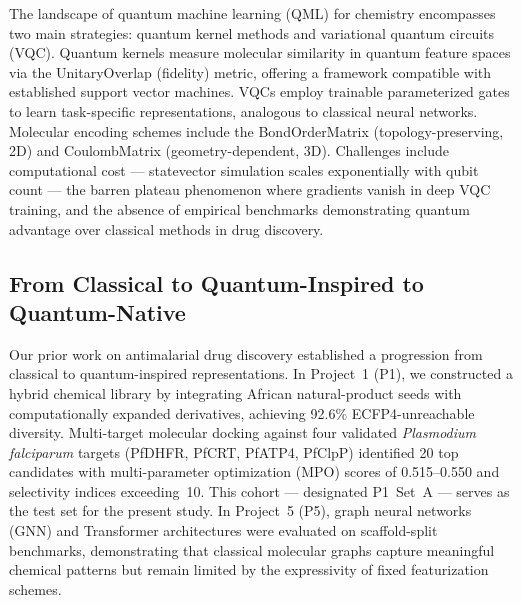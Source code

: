 The landscape of quantum machine learning (QML) for chemistry encompasses two main strategies: quantum kernel methods\cite{Havlicek2019QuantumKernel,Schuld2019QuantumML} and variational quantum circuits (VQC).\cite{Cerezo2021VQA,McClean2018Barren} Quantum kernels measure molecular similarity in quantum feature spaces via the UnitaryOverlap (fidelity) metric,\cite{Havlicek2019QuantumKernel} offering a framework compatible with established support vector machines. VQCs employ trainable parameterized gates to learn task-specific representations,\cite{Benedetti2019PQC} analogous to classical neural networks. Molecular encoding schemes include the BondOrderMatrix\cite{Boy2025QMSE} (topology-preserving, 2D) and CoulombMatrix\cite{Rupp2012CoulombMatrix} (geometry-dependent, 3D). Challenges include computational cost — statevector simulation scales exponentially with qubit count — the barren plateau phenomenon where gradients vanish in deep VQC training,\cite{McClean2018Barren,Cerezo2021VQA} and the absence of empirical benchmarks demonstrating quantum advantage over classical methods in drug discovery.

\subsection{From Classical to Quantum-Inspired to Quantum-Native}

Our prior work on antimalarial drug discovery established a progression from classical to quantum-inspired representations. In Project~1 (P1),\cite{Sao2026P1ChemSpace} we constructed a hybrid chemical library by integrating African natural-product seeds with computationally expanded derivatives, achieving 92.6\% ECFP4-unreachable diversity. Multi-target molecular docking against four validated \textit{Plasmodium falciparum} targets (PfDHFR, PfCRT, PfATP4, PfClpP) identified 20 top candidates with multi-parameter optimization (MPO) scores of 0.515--0.550 and selectivity indices exceeding~10. This cohort — designated P1~Set~A — serves as the test set for the present study. In Project~5 (P5),\cite{Sao2026P5GraphLearning} graph neural networks (GNN) and Transformer architectures were evaluated on scaffold-split benchmarks, demonstrating that classical molecular graphs capture meaningful chemical patterns but remain limited by the expressivity of fixed featurization schemes.

